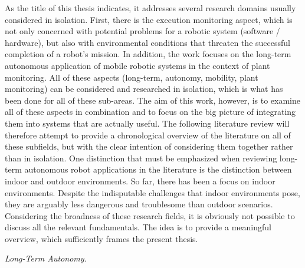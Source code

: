 \documentclass[english, master, utf8]{base/thesis_KBS}
\begin{document}
As the title of this thesis indicates, it addresses several research domains usually considered in isolation. First, there is the execution monitoring aspect, which is not only
concerned with potential problems for a robotic system (software / hardware), but also with environmental conditions that threaten the successful completion of a robot's mission.
In addition, the work focuses on the long-term autonomous application of mobile robotic systems in the context of plant monitoring. All of these aspects (long-term, autonomy,
mobility, plant monitoring) can be considered and researched in isolation, which is what has been done for all of these sub-areas. The aim of this work, however, is to examine all of
these aspects in combination and to focus on the big picture of integrating them into systems that are actually useful. The following literature review will therefore attempt to
provide a chronological overview of the literature on all of these subfields, but with the clear intention of considering them together rather than in isolation.
One distinction that must be emphasized when reviewing long-term autonomous robot applications in the literature is the distinction between indoor and outdoor environments.
So far, there has been a focus on indoor environments. \cite{Kyberd:2021} Despite the indisputable challenges that indoor environments pose, they are arguably less dangerous and
troublesome than outdoor scenarios. \cite{Hawes:2017} Considering the broadness of these research fields, it is obviously not possible to discuss all the relevant fundamentals.
The idea is to provide a meaningful overview, which sufficiently frames the present thesis.\newline

\noindent
\textit{Long-Term Autonomy.}\newline
\end{document}
